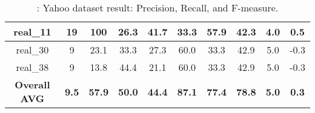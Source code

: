 \begin{table*}[h]
\begin{tabular}{|c|c|c|c|c|c|c|c|c|c|}
		\midrule
		real\_11 & 19    & 100 & 26.3  & 41.7  & 33.3  & 57.9  & 42.3  & 4.0   & 0.5 \\
		\midrule
		real\_30 & 9     & 23.1  & 33.3  & 27.3  & 60.0  & 33.3  & 42.9  & 5.0   & -0.3 \\
		\midrule
		real\_38 & 9     & 13.8  & 44.4  & 21.1  & 60.0  & 33.3  & 42.9  & 5.0   & -0.3 \\
		\midrule
		\rowcolor[rgb]{ 1,  1,  0} \textbf{Overall AVG} & \textbf{9.5} & \textbf{57.9} & \textbf{50.0} & \textbf{44.4} & \textbf{87.1} & \textbf{77.4} & \textbf{78.8} & \textbf{5.0} & \textbf{0.3} \\
		\bottomrule
	\end{tabular}%
			\caption{: Yahoo dataset result: Precision, Recall, and F-measure.}
	\label{tab:yahoo_data}%
\end{table*}%
